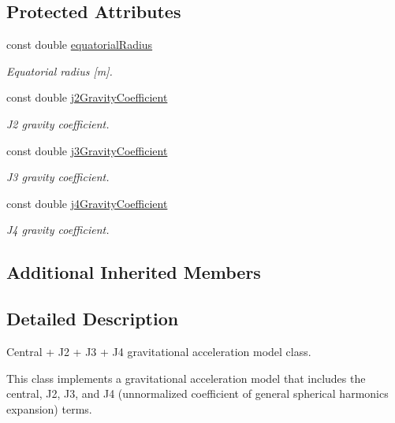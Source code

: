 \subsection*{Protected Attributes}
\begin{DoxyCompactItemize}
\item 
const double \hyperlink{classtudat_1_1gravitation_1_1CentralJ2J3J4GravitationalAccelerationModel_a651dd6a21d94ff0adf69f46467eb2b9c}{equatorial\+Radius}
\begin{DoxyCompactList}\small\item\em Equatorial radius \mbox{[}m\mbox{]}. \end{DoxyCompactList}\item 
const double \hyperlink{classtudat_1_1gravitation_1_1CentralJ2J3J4GravitationalAccelerationModel_a071e61410c0e357127de1b14dc8e8fa3}{j2\+Gravity\+Coefficient}
\begin{DoxyCompactList}\small\item\em J2 gravity coefficient. \end{DoxyCompactList}\item 
const double \hyperlink{classtudat_1_1gravitation_1_1CentralJ2J3J4GravitationalAccelerationModel_af50f73459c35cf1861773b3e90a48e6d}{j3\+Gravity\+Coefficient}
\begin{DoxyCompactList}\small\item\em J3 gravity coefficient. \end{DoxyCompactList}\item 
const double \hyperlink{classtudat_1_1gravitation_1_1CentralJ2J3J4GravitationalAccelerationModel_a7caa1cdd5f679d90350a0eeebca5661b}{j4\+Gravity\+Coefficient}
\begin{DoxyCompactList}\small\item\em J4 gravity coefficient. \end{DoxyCompactList}\end{DoxyCompactItemize}
\subsection*{Additional Inherited Members}


\subsection{Detailed Description}
Central + J2 + J3 + J4 gravitational acceleration model class. 

This class implements a gravitational acceleration model that includes the central, J2, J3, and J4 (unnormalized coefficient of general spherical harmonics expansion) terms. 

